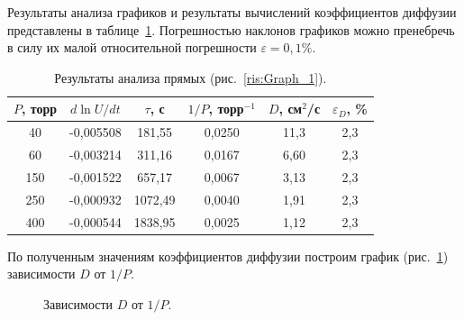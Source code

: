 \documentclass[a4paper,12pt]{article} %
\begin{document}
	Результаты анализа графиков и результаты вычислений коэффициентов диффузии представлены в таблице~\ref{table:analis_of_graph}. Погрешностью наклонов графиков можно пренебречь в силу их малой относительной погрешности $\varepsilon = 0,1 \% $.
	\begin{table}[H]
		\caption{Результаты анализа прямых (рис.~\ref{ris:Graph_1}).}
		\label{table:analis_of_graph}
		\begin{tabular}{|c|c|c|c|c|c|}
			\hline
				$P$, торр & $d\ln U /dt$ & $\tau$, с & $1/P$, торр$^{-1}$ & $D$, см$^2$/с & $\varepsilon_D$, \% \\ \hline
				40        & -0,005508    & 181,55    & 0,0250             & 11,3          & 2,3                 \\ \hline
				60        & -0,003214    & 311,16    & 0,0167             & 6,60          & 2,3                 \\ \hline
				150       & -0,001522    & 657,17    & 0,0067             & 3,13          & 2,3                 \\ \hline
				250       & -0,000932    & 1072,49   & 0,0040             & 1,91          & 2,3                 \\ \hline
				400       & -0,000544    & 1838,95   & 0,0025             & 1,12          & 2,3                 \\ \hline
		\end{tabular}
	\end{table}
	По полученным значениям коэффициентов диффузии построим график (рис.~\ref{ris:Graph_2}) зависимости $D$ от $1/P$.
	\begin{figure}[H]
		\caption{Зависимости $D$ от $1/P$.}
		\label{ris:Graph_2}
	\end{figure}
\end{document}
